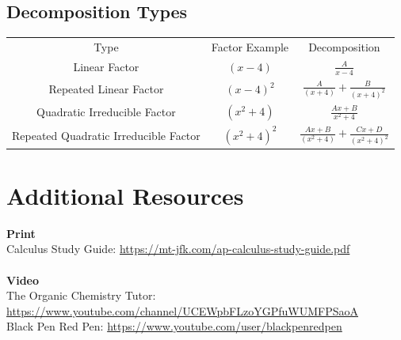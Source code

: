 \documentclass[12pt, letterpaper]{article}
\begin{document}
\subsection{Decomposition Types}
\begin{center}
\begin{tabular}{c c c}
Type & Factor Example & Decomposition\\
Linear Factor & $(x-4)$ & $\frac{A}{x-4}$\\
Repeated Linear Factor & $(x-4)^2$ & $\frac{A}{(x+4)} + \frac{B}{(x+4)^2}$\\
Quadratic Irreducible Factor & $(x^2+4)$ & $\frac{Ax+B}{x^2+4}$\\
Repeated Quadratic Irreducible Factor & $(x^2+4)^2$ & $\frac{Ax+B}{(x^2+4)} + \frac{Cx+D}{(x^2+4)^2}$
\end{tabular}
\end{center}

\pagebreak

\section{Additional Resources}
\textbf{Print}\\
Calculus Study Guide: \url{https://mt-jfk.com/ap-calculus-study-guide.pdf}\\
\\
\textbf{Video}\\
The Organic Chemistry Tutor: \url{https://www.youtube.com/channel/UCEWpbFLzoYGPfuWUMFPSaoA}\\
Black Pen Red Pen: \url{https://www.youtube.com/user/blackpenredpen}
\end{document}
